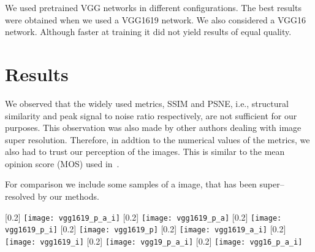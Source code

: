 \documentclass[10pt,twocolumn,letterpaper]{article}
\begin{document}
We used pretrained VGG networks in different configurations. The best
results were obtained when we used a VGG1619 network. We also
considered a VGG16 network. Although faster at training it did not
yield results of equal quality.


\section{Results}
\label{sec:results}


We observed that the widely used metrics, SSIM and PSNE, i.\;e.,
structural similarity and peak signal to noise ratio respectively, are
not sufficient for our purposes. This observation was also made by
other authors dealing with image super resolution. Therefore, in
addtion to the numerical values of the metrics, we also had to trust
our perception of the images. This is similar to the mean opinion
score (MOS) used in~\cite{LedigChristian2016PSIS}.

For comparison we include some samples of a image, that has been
super--resolved by our methods.

\begin{figure*}[h]
  \centering
  [0.2\linewidth]{%
    \texttt{[image: vgg1619\_p\_a\_i]}
  }
  [0.2\linewidth]{%
    \texttt{[image: vgg1619\_p\_a]}
  }
  [0.2\linewidth]{%
    \texttt{[image: vgg1619\_p\_i]}
  }
  [0.2\linewidth]{%
    \texttt{[image: vgg1619\_p]}
  }
  [0.2\linewidth]{%
    \texttt{[image: vgg1619\_a\_i]}
  }
  [0.2\linewidth]{%
    \texttt{[image: vgg1619\_i]}
  }
  [0.2\linewidth]{%
    \texttt{[image: vgg19\_p\_a\_i]}
  }
  [0.2\linewidth]{%
    \texttt{[image: vgg16\_p\_a\_i]}
  }
\end{figure*}
\end{document}
